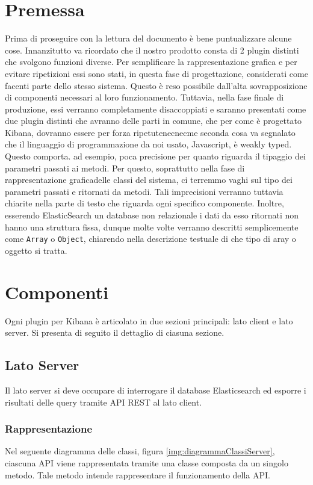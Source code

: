
\section{Premessa}
Prima di proseguire con la lettura del documento è bene puntualizzare alcune cose.
Innanzitutto va ricordato che il nostro prodotto consta di 2 plugin distinti che svolgono funzioni diverse. Per semplificare la rappresentazione grafica e per evitare ripetizioni essi sono stati, in questa fase di progettazione, considerati come facenti parte dello stesso sistema. Questo è reso possibile dall'alta sovrapposizione di componenti necessari al loro funzionamento. Tuttavia, nella fase finale di produzione, essi verranno completamente disaccoppiati e saranno presentati come due plugin distinti che avranno delle parti in comune, che per come è progettato Kibana, dovranno essere per forza ripetutenecnecme seconda cosa va segnalato che il linguaggio di programmazione da noi usato, Javascript, è weakly typed. Questo comporta. ad esempio, poca precisione per quanto riguarda il tipaggio dei parametri passati ai metodi. Per questo, soprattutto nella fase di rappresentazione graficadelle classi del sistema, ci terremmo vaghi sul tipo dei parametri passati e ritornati da metodi. Tali imprecisioni verranno tuttavia chiarite nella parte di testo che riguarda ogni specifico componente. Inoltre, esserendo ElasticSearch un database non relazionale i dati da esso ritornati non hanno una struttura fissa, dunque molte volte verranno descritti semplicemente come \texttt{Array} o \texttt{Object}, chiarendo nella descrizione testuale di che tipo di aray o oggetto si tratta.

\section{Componenti}

Ogni plugin per Kibana è articolato in due sezioni principali: lato client e lato server. Si presenta di seguito il dettaglio di ciasuna sezione.

\subsection{Lato Server}
Il lato server si deve occupare di interrogare il database Elasticsearch ed esporre i risultati delle query tramite API REST al lato client.
\subsubsection{Rappresentazione}
Nel seguente diagramma delle classi, figura \ref{img:diagrammaClassiServer}, ciascuna API viene rappresentata tramite una classe composta da un singolo metodo. Tale metodo intende rappresentare il funzionamento della API.


